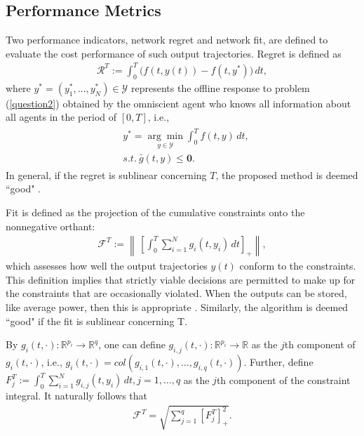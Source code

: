 \documentclass[final,5p,times,twocolumn,authoryear]{elsarticle}
\begin{document}
\subsection{ Performance Metrics}
	Two performance indicators, network regret and network fit, are defined to evaluate the cost performance of such output trajectories. Regret is defined as
	\begin{align}
		\mathcal{R}^T:=\int_{0}^{T} \Big(f(t,y(t))-f(t,y^*)\Big)\,dt\label{regert},
	\end{align}
	where $y^*=(y_1^*,\dots,y_N^*)\in \mathcal{Y}$ represents the offline response to problem (\ref{question2}) obtained by the omniscient agent who knows all information about all agents in the period of $[0, T]$, i.e.,
	\begin{align}
		\begin{split}
		&y^*=\underset{y\in\mathcal{Y}}{\arg\min} \int_{0}^{T}f(t,y)\,dt ,\\
		&s.t. ~\bar g(t,y)\le \boldsymbol0.
		\end{split}
	\end{align}
	In general, if the regret is sublinear concerning $T$, the proposed method is deemed ``good" \citep{li2022sur}. 
	
	
	Fit is defined as the projection of the cumulative constraints onto the nonnegative orthant:
	\begin{align}
		\mathcal{F}^T:=\left\|\,\left[\int_{0}^{T} \sum_{i=1}^{N}g_{i}(t, y_i) \,dt\right]_+\right\|,\label{fit}
	\end{align}
	which assesses how well the output trajectories $y(t)$ conform to the constraints.
	This definition implies that strictly viable decisions are permitted to make up for the constraints that are occasionally violated. When the outputs can be stored, like average power, then this is appropriate \citep{pater2017}.
	Similarly, the algorithm is deemed ``good" if the fit is sublinear concerning T.
	
	By $g_i(t,\cdot): \mathbb{R}^{p_i}\to \mathbb{R}^{q}$, one can define $g_{i,j}(t,\cdot): \mathbb{R}^{p_i} \to \mathbb{R}$ as the $j$th component of $g_i(t,\cdot)$, i.e., $g_i(t,\cdot) = col\left(g_{i,1}(t,\cdot), \dots, g_{i,q}(t,\cdot)\right)$. Further, define $F_j^T:=\int_{0}^{T} \sum_{i=1}^{N}g_{i,j}(t, y_i)\,dt, j=1,\dots,q$ as the $j$th component of the constraint integral. It naturally follows that %
	\begin{align}
		\mathcal{F}^T=\sqrt{\sum_{j=1}^q\left[F_j^T\right]_+^2}.
	\end{align}
	
\end{document}
